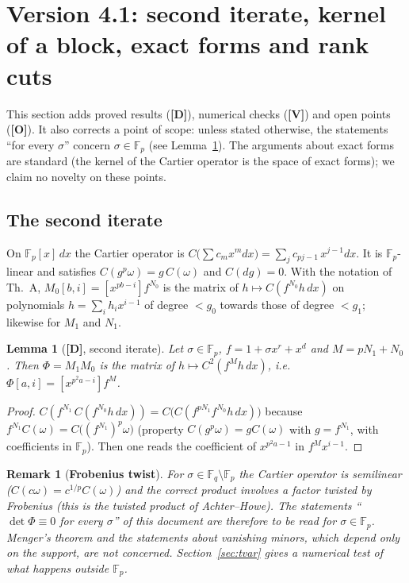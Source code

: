 \documentclass[11pt,a4paper]{article}
\newtheorem{lemma}[theorem]{Lemma}
\newtheorem{remark}[theorem]{Remark}
\newcommand{\F}{\mathbb{F}}
\begin{document}
\section{Version 4.1: second iterate, kernel of a block, exact forms and rank cuts}
\label{sec:v41}

This section adds proved results (\textbf{[D]}), numerical checks (\textbf{[V]})
and open points (\textbf{[O]}). It also corrects a point of scope: unless stated
otherwise, the statements ``for every $\sigma$'' concern $\sigma\in\F_p$ (see
Lemma~\ref{lem:iter}). The arguments about exact forms are standard (the kernel
of the Cartier operator is the space of exact forms); we claim no novelty on
these points.

\subsection*{The second iterate}

On $\F_p[x]\,dx$ the Cartier operator is
$C\big(\sum c_m x^m dx\big)=\sum_j c_{pj-1}\,x^{j-1}dx$. It is $\F_p$-linear and
satisfies $C(g^p\omega)=g\,C(\omega)$ and $C(dg)=0$. With the notation of Th.~A,
$M_0[b,i]=[x^{pb-i}]f^{N_0}$ is the matrix of $h\mapsto C(f^{N_0}h\,dx)$ on
polynomials $h=\sum_i h_ix^{i-1}$ of degree $<g_0$ towards those of degree
$<g_1$; likewise for $M_1$ and $N_1$.

\begin{lemma}[\textbf{[D]}, second iterate]
\label{lem:iter}
Let $\sigma\in\F_p$, $f=1+\sigma x^r+x^d$ and $M=pN_1+N_0$. Then $\Phi=M_1M_0$ is
the matrix of $h\mapsto C^2(f^{M}h\,dx)$, i.e.\ $\Phi[a,i]=[x^{p^2a-i}]f^{M}$.
\end{lemma}
\begin{proof}
$C(f^{N_1}\,C(f^{N_0}h\,dx))=C\big(C(f^{pN_1}f^{N_0}h\,dx)\big)$ because
$f^{N_1}C(\omega)=C\big((f^{N_1})^p\omega\big)$ (property $C(g^p\omega)=gC(\omega)$
with $g=f^{N_1}$, with coefficients in $\F_p$). Then one reads the coefficient of
$x^{p^2a-1}$ in $f^{M}x^{i-1}$.
\end{proof}

\begin{remark}[\textbf{Frobenius twist}]
For $\sigma\in\F_q\setminus\F_p$ the Cartier operator is semilinear
($C(c\omega)=c^{1/p}C(\omega)$) and the correct product involves a factor twisted
by Frobenius (this is the twisted product of Achter--Howe). The statements
``$\det\Phi\equiv0$ for every $\sigma$'' of this document are therefore to be
read for $\sigma\in\F_p$. Menger's theorem and the statements about vanishing
minors, which depend only on the support, are not concerned. Section~\ref{sec:tvar}
gives a numerical test of what happens outside $\F_p$.
\end{remark}
\end{document}
